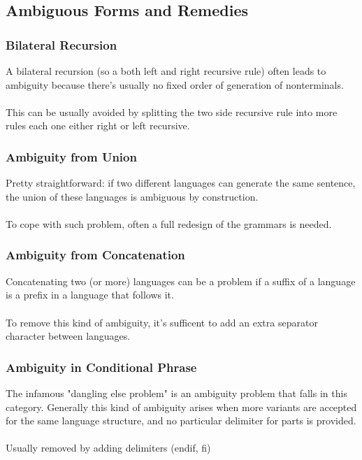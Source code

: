 		\subsection{Ambiguous Forms and Remedies}
			\subsubsection{Bilateral Recursion}
				A bilateral recursion (so a both left and right recursive rule) often leads to ambiguity because there's usually no fixed order of generation of nonterminals.\\\\
				This can be usually avoided by splitting the two side recursive rule into more rules each one either right or left recursive.\\
			\subsubsection{Ambiguity from Union}
				Pretty straightforward: if two different languages can generate the same sentence, the union of these languages is ambiguous by construction.\\\\
				To cope with such problem, often a full redesign of the grammars is needed.\\
			\subsubsection{Ambiguity from Concatenation}
				Concatenating two (or more) languages can be a problem if a suffix of a language is a prefix in a language that follows it.\\\\
				To remove this kind of ambiguity, it's sufficent to add an extra separator character between languages.\\
			\subsubsection{Ambiguity in Conditional Phrase}
				The infamous "dangling else problem" is an ambiguity problem that falls in this category. Generally this kind of ambiguity arises when more variants are accepted for the same language structure, and no particular delimiter for parts is provided.\\\\
				Usually removed by adding delimiters (endif, fi)\\
